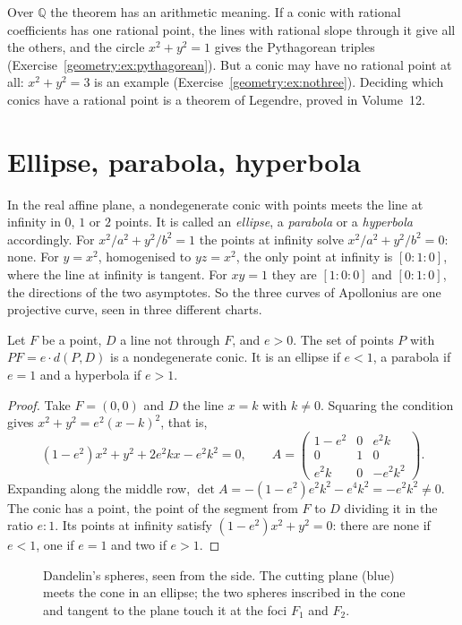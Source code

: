 Over $\mathbb Q$ the theorem has an arithmetic meaning. If a conic with rational coefficients has one rational point, the lines with rational slope
through it give all the others, and the circle $x^2+y^2=1$ gives the Pythagorean triples (Exercise~\ref{geometry:ex:pythagorean}). But a conic may have no
rational point at all: $x^2+y^2=3$ is an example (Exercise~\ref{geometry:ex:nothree}). Deciding which conics have a rational point is a theorem of Legendre,
proved in Volume~12.

\section{Ellipse, parabola, hyperbola}

In the real affine plane, a nondegenerate conic with points meets the line at infinity in $0$, $1$ or $2$ points. It is called an \emph{ellipse}, a
\emph{parabola} or a \emph{hyperbola} accordingly. For $x^2/a^2+y^2/b^2=1$ the points at infinity solve $x^2/a^2+y^2/b^2=0$: none. For $y=x^2$,
homogenised to $yz=x^2$, the only point at infinity is $[0:1:0]$, where the line at infinity is tangent. For $xy=1$ they are $[1:0:0]$ and $[0:1:0]$,
the directions of the two asymptotes. So the three curves of Apollonius are one projective curve, seen in three different charts.

\begin{proposition}\label{geometry:prop:focus}
Let $F$ be a point, $D$ a line not through $F$, and $e>0$. The set of points $P$ with $PF=e\cdot d(P,D)$ is a nondegenerate conic. It is an ellipse
if $e<1$, a parabola if $e=1$ and a hyperbola if $e>1$.
\end{proposition}

\begin{proof}
Take $F=(0,0)$ and $D$ the line $x=k$ with $k\ne0$. Squaring the condition gives $x^2+y^2=e^2(x-k)^2$, that is,
\[
(1-e^2)x^2+y^2+2e^2kx-e^2k^2=0,\qquad
A=\begin{pmatrix}1-e^2&0&e^2k\\0&1&0\\e^2k&0&-e^2k^2\end{pmatrix}.
\]
Expanding along the middle row, $\det A=-(1-e^2)e^2k^2-e^4k^2=-e^2k^2\ne0$. The conic has a point, the point of the segment from $F$ to $D$ dividing it
in the ratio $e:1$. Its points at infinity satisfy $(1-e^2)x^2+y^2=0$: there are none if $e<1$, one if $e=1$ and two if $e>1$.
\end{proof}

\begin{figure}[ht]
\centering
{}
\caption{Dandelin's spheres, seen from the side. The cutting plane (blue) meets the cone in an ellipse; the two spheres inscribed in the cone and
tangent to the plane touch it at the foci $F_1$ and $F_2$.}
\label{geometry:fig:dandelin}
\end{figure}

